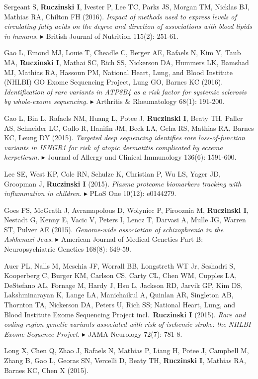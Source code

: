 \documentclass[10pt]{article}
\newcommand{\mine}{
  \addtocounter{enumi}{1}
\item[\fcolorbox{white}{grey}{\color{white} \tiny \arabic{enumi}}]
}
\newcommand{\dg}[1]{{\color{black} $\blacktriangleright$ {#1}}}
\begin{document}
\item 
Sergeant S, {\bf Ruczinski I}, Ivester P, Lee TC, Parks JS, Morgan TM, Nicklas BJ, Mathias RA, Chilton FH (2016).
{\it Impact of methods used to express levels of circulating fatty acids on the degree and direction of associations with blood lipids in humans.}
\dg{British Journal of Nutrition 115(2): 251-61.}
\item 
Gao L, Emond MJ, Louie T, Cheadle C, Berger AE, Rafaels N, Kim Y, Taub MA, {\bf Ruczinski I}, Mathai SC, Rich SS, Nickerson DA, Hummers LK, Bamshad MJ, Mathias RA, Hassoun PM, National Heart, Lung, and Blood Institute (NHLBI) GO Exome Sequencing Project, Lung GO, Barnes KC (2016).
{\it Identification of rare variants in ATP8B4 as a risk factor for systemic sclerosis by whole-exome sequencing.} 
\dg{Arthritis \& Rheumatology 68(1): 191-200.}
\item
Gao L, Bin L, Rafaels NM, Huang L, Potee J, {\bf Ruczinski I}, Beaty TH, Paller AS, Schneider LC, Gallo R, Hanifin JM, Beck LA, Geha RS, Mathias RA, Barnes KC, Leung DY (2015).
{\it Targeted deep sequencing identifies rare loss-of-function variants in IFNGR1 for risk of atopic dermatitis complicated by eczema herpeticum.}
\dg{Journal of Allergy and Clinical Immunology 136(6): 1591-600.}
\mine
Lee SE, West KP, Cole RN, Schulze K, Christian P, Wu LS, Yager JD, Groopman J, {\bf Ruczinski I} (2015).
{\it Plasma proteome biomarkers tracking with inflammation in children.}
\dg{PLoS One 10(12): e0144279.}
\item 
Goes FS, McGrath J, Avramapolous D, Wolyniec P, Pirooznia M, {\bf Ruczinski I}, Nestadt G, Kenny E, Vacic V, Peters I, Lencz T, Darvasi A, Mulle JG, Warren ST, Pulver AE (2015).
{\it Genome-wide association of schizophrenia in the Ashkenazi Jews.}
\dg{American Journal of Medical Genetics Part B: Neuropsychiatric Genetics 168(8): 649-59.}
\item
Auer PL, Nalls M, Meschia JF, Worrall BB, Longstreth WT Jr, Seshadri S, Kooperberg C, Burger KM, Carlson CS, Carty CL, Chen WM, Cupples LA, DeStefano AL, Fornage M, Hardy J, Hsu L, Jackson RD, Jarvik GP, Kim DS, Lakshminarayan K, Lange LA, Manichaikul A, Quinlan AR, Singleton AB, Thornton TA, Nickerson DA, Peters U, Rich SS; National Heart, Lung, and Blood Institute Exome Sequencing Project incl.~{\bf Ruczinski I} (2015).
{\it Rare and coding region genetic variants associated with risk of ischemic stroke: the NHLBI Exome Sequence Project.}
\dg{JAMA Neurology 72(7): 781-8.}
\item 
Long X, Chen Q, Zhao J, Rafaels N, Mathias P, Liang H, Potee J, Campbell M, Zhang B, Gao L, Georas SN, Vercelli D, Beaty TH, {\bf Ruczinski I}, Mathias RA, Barnes KC, Chen X (2015).
\end{document}
